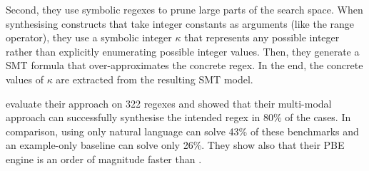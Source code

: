 Second, they use symbolic regexes to prune large parts of the search space.
When synthesising constructs that take integer constants as arguments (like the range operator), they use a symbolic integer \(\kappa\) that represents any possible integer rather than explicitly enumerating possible integer values.
Then, they generate a SMT formula that over-approximates the concrete regex.
In the end, the concrete values of \(\kappa\) are extracted from the resulting \ac{SMT} model.

\citeauthor{Regel20} evaluate their approach on 322 regexes and showed that their multi-modal approach can successfully synthesise the intended regex in 80\% of the cases. In comparison, using only natural language can solve 43\% of these benchmarks and an example-only baseline can solve only 26\%. 
%
They show also that their PBE engine is an order of magnitude faster than \AlphaRegex.
